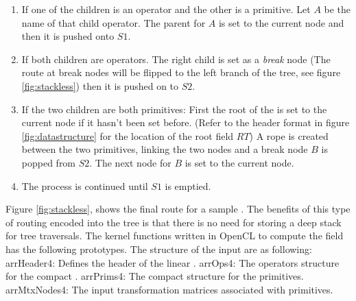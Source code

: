 \begin{enumerate}
 \item If one of the children is an operator and the other is a primitive. Let $A$ be the name of that child operator. The parent for $A$ is set 
 to the current node and then it is pushed onto $S1$.
 
 \item If both children are operators. The right child is set as a \textit{break} node (The route at break nodes will be flipped to 
 the left branch of the tree, see figure \ref{fig:stackless}) then it is pushed on to $S2$.
 
 \item If the two children are both primitives: First the root of the \blob is set to the current node if it hasn't been set before.
  (Refer to the \blob header format in figure \ref{fig:datastructure} for the location of the root field $RT$) 
  A rope is created between the two primitives, linking the two nodes and a break node $B$ is popped from $S2$. 
  The next node for $B$ is set to the current node.
 
  
 \item The process is continued until $S1$ is emptied.
\end{enumerate}


Figure \ref{fig:stackless}, shows the final route for a sample \blob. The benefits of this type of routing encoded into the tree
is that there is no need for storing a deep stack for tree traversals. The kernel functions written in OpenCL to compute the field
has the following prototypes. The structure of the input \blob are as following:
arrHeader4: Defines the header of the linear \blob.
arrOps4: The operators structure for the compact \blob.
arrPrims4: The compact structure for the primitives.
arrMtxNodes4: The input transformation matrices associated with primitives.


